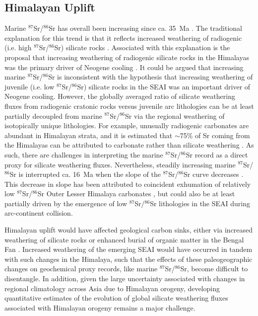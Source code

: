 \documentclass[9pt,twocolumn,twoside,lineno]{pnas-new}
\newcommand{\SrSr}{$^{87}$Sr/$^{86}$Sr\xspace}
\begin{document}
\begin{figure}[h!]
    \label{fig:weatherability_curves}
\end{figure}

\subsection*{Himalayan Uplift}

Marine \SrSr has overall been increasing since ca. 35~Ma \cite{McArthur2012a}. The traditional explanation for this trend is that it reflects increased weathering of radiogenic (i.e. high \SrSr) silicate rocks \cite{Raymo1988a}. Associated with this explanation is the proposal that increasing weathering of radiogenic silicate rocks in the Himalayas was the primary driver of Neogene cooling \cite{Raymo1992a}. It could be argued that increasing marine \SrSr is inconsistent with the hypothesis that increasing weathering of juvenile (i.e. low \SrSr) silicate rocks in the SEAI was an important driver of Neogene cooling. However, the globally averaged ratio of silicate weathering fluxes from radiogenic cratonic rocks versus juvenile arc lithologies can be at least partially decoupled from marine \SrSr via the regional weathering of isotopically unique lithologies. For example, unusually radiogenic carbonates are abundant in Himalayan strata, and it is estimated that $\sim$75\% of Sr coming from the Himalayas can be attributed to carbonate rather than silicate weathering \cite{Jacobson2002a, Quade2003a, Oliver2003a}. As such, there are challenges in interpreting the marine \SrSr record as a direct proxy for silicate weathering fluxes. Nevertheless, steadily increasing marine \SrSr is interrupted ca. 16~Ma when the slope of the \SrSr curve decreases \cite{McArthur2012a}. This decrease in slope has been attributed to coincident exhumation of relatively low \SrSr Outer Lesser Himalaya carbonates \cite{Myrow2015a, Colleps2018a}, but could also be at least partially driven by the emergence of low \SrSr lithologies in the SEAI during arc-continent collision.

Himalayan uplift would have affected geological carbon sinks, either via increased weathering of silicate rocks \cite{Raymo1992a} or enhanced burial of organic matter in the Bengal Fan \cite{Galy2007a}. Increased weathering of the emerging SEAI would have occurred in tandem with such changes in the Himalaya, such that the effects of these paleogeographic changes on geochemical proxy records, like marine \SrSr, become difficult to disentangle. In addition, given the large uncertainty associated with changes in regional climatology across Asia due to Himalayan orogeny, developing quantitative estimates of the evolution of global silicate weathering fluxes associated with Himalayan orogeny remains a major challenge.
\end{document}
